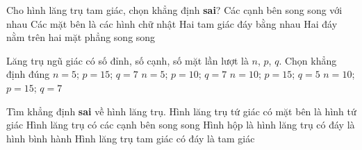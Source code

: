 \begin{ex}%
	Cho hình lăng  trụ tam giác, chọn khẳng định \textbf{sai}?
	 \choice
		{Các cạnh bên song  song với nhau}
		{\True Các mặt bên  là các hình chữ nhật}
		{Hai tam giác  đáy bằng nhau}
		{Hai đáy nằm trên hai  mặt phẳng song song}
\end{ex}

\begin{ex}%
	Lăng trụ ngũ  giác có số đỉnh, số cạnh, số mặt lần lượt là $n$, $ p$, $ q$. Chọn khẳng định đúng
	 \choice
		{$n=5$;  $p=15$; $q=7$}
		{$n=5$;  $p=10$; $q=7$}
		{$n=10$; $p=15$; $q=5$} 
		{\True $n=10$; $p=15$; $q=7$} 
\end{ex}

\begin{ex}%
	Tìm khẳng  định \textbf{ sai } về hình lăng trụ.
	\choice 
		{ \True Hình lăng trụ tứ giác  có mặt bên là hình tứ giác}
		{ Hình lăng trụ có các cạnh bên song song} 
		{ Hình hộp là hình lăng trụ có đáy là  hình bình hành}
		{ Hình lăng  trụ tam giác có đáy là tam giác}
\end{ex}

